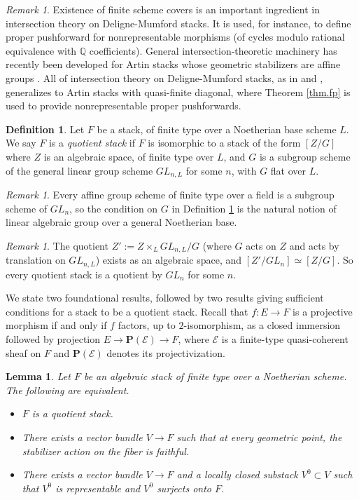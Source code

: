 \documentclass[12pt]{amsart}
\newcommand{\Q}{{\mathbb Q}}
\newcommand{\cE}{{\mathcal E}}
\theoremstyle{plain}
\newtheorem  {lemma}[thm] {Lemma}
\theoremstyle{definition}
\newtheorem  {defn} [thm] {Definition}
\theoremstyle{remark}
\newtheorem {remark} [thm]  {Remark}
\begin{document}
\begin{remark}
Existence of finite scheme covers is an important ingredient in
intersection theory on Deligne-Mumford stacks.
It is used, for instance, to
define proper pushforward for nonrepresentable morphisms
(of cycles modulo rational equivalence with $\Q$ coefficients).
General intersection-theoretic machinery has recently been developed for
Artin stacks whose geometric stabilizers are affine groups \cite{Kr}.
All of intersection theory on Deligne-Mumford stacks, as in
\cite{Gi} and \cite{Vi},
generalizes to
Artin stacks with quasi-finite diagonal, where
Theorem \ref{thm.fp} is used to provide nonrepresentable proper pushforwards.
\end{remark}

\begin{defn}
\label{defnquotient}
Let $F$ be a stack, of finite type over a Noetherian base scheme $L$.
We say $F$ is a {\em quotient stack} if $F$ is isomorphic to a
stack of the form $[Z/G]$ where $Z$ is an algebraic space,
of finite type over $L$, and $G$ is
a subgroup scheme of the general linear group scheme
$GL_{n,L}$ for some $n$, with $G$ flat over $L$.
\end{defn}

\begin{remark}
Every affine group scheme of finite type over a field is a subgroup
scheme of $GL_n$, so the condition on $G$ in Definition \ref{defnquotient}
is the natural notion of linear algebraic group over a general
Noetherian base.
\end{remark}

\begin{remark}
The quotient $Z':=Z\times_L GL_{n,L}/G$ (where $G$ acts on $Z$
and acts by translation on $GL_{n,L}$) exists
as an algebraic space, and
$[Z'/GL_n]\simeq[Z/G]$.
So every quotient stack is a quotient by $GL_n$ for some $n$.
\end{remark}

We state two foundational results, followed by two results giving sufficient
conditions for a stack to be a quotient stack.
Recall that $f\colon E\to F$ is a projective morphism if and only if
$f$ factors, up to $2$-isomorphism, as a closed immersion followed by
projection $E\to {\mathbf P}(\cE)\to F$, where $\cE$ is a
finite-type quasi-coherent sheaf on $F$ and ${\mathbf P}(\cE)$ denotes
its projectivization.

\begin{lemma} \label{l.vbqs}
Let $F$ be an algebraic stack of finite type over a Noetherian scheme.
The following are equivalent.
\begin{itemize}
\item[(i)] $F$ is a quotient stack.
\item[(ii)] There exists a vector bundle $V\to F$ such that at every geometric
point, the stabilizer action on the fiber is faithful.
\item[(iii)] There exists a vector bundle $V\to F$ and a locally closed substack
$V^0\subset V$ such that $V^0$ is representable and $V^0$ surjects onto $F$.
\end{itemize}
\end{lemma}
\end{document}
